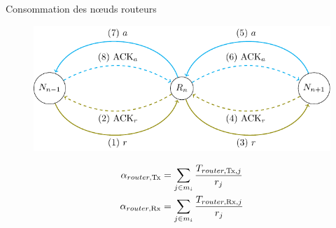 \begin{frame}{Consommation des nœuds routeurs}

  \begin{figure}
    \centering
    \includegraphics[scale=.8]{figures/conso_routeur_slides.pdf}
  \end{figure}

    \begin{align}
      \alpha_{router, \textrm{Tx}} &= \sum_{j \in m_i} \frac{T_{router, \textrm{Tx}, j}}{r_j}
      \label{contikimac:eq:router_tx}\\
      \alpha_{router, \textrm{Rx}} &= \sum_{j \in m_i} \frac{T_{router, \textrm{Rx}, j}}{r_j}
      \label{contikimac:eq:router_rx}
    \end{align}


\end{frame}

